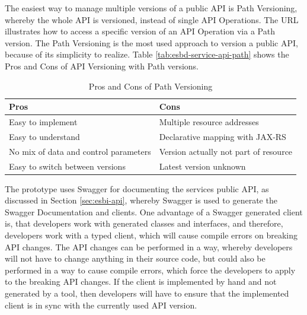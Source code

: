 The easiest way to manage multiple versions of a public API is Path Versioning, whereby the whole API is versioned, instead of single API Operations. The URL  illustrates how to access a specific version of an API Operation via a Path version. The Path Versioning is the most used approach to version a public API, because of its simplicity to realize.  Table \vref{tab:esbd-service-api-path} shows the Pros and Cons of API Versioning with Path versions.

{\renewcommand{\arraystretch}{1.2}%
	\begin{table}[h]
		\begin{tabularx}{\textwidth}{ X|X }	
			\textbf{Pros}                         & \textbf{Cons}                         \\ \hline
			Easy to implement                     & Multiple resource addresses           \\ \hline
			Easy to understand                    & Declarative mapping with JAX-RS       \\ \hline
			No mix of data and control parameters & Version actually not part of resource \\ \hline
			Easy to switch between versions       & Latest version unknown                \\ \hline
		\end{tabularx}
		\caption{Pros and Cons of Path Versioning}
		\label{tab:esbd-service-api-path}
\end{table}}

The prototype uses Swagger for documenting the services public API, as discussed in Section \vref{sec:esbi-api}, whereby Swagger is used to generate the Swagger Documentation and clients. One advantage of a Swagger generated client is, that developers work with generated classes and interfaces, and therefore, developers work with a typed client, which will cause compile errors on breaking API changes. The API changes can be performed in a way, whereby developers will not have to change anything in their source code, but could also be performed in a way to cause compile errors, which force the developers to apply to the breaking API changes. If the client is implemented by hand and not generated by a tool, then developers will have to ensure that the implemented client is in sync with the currently used API version.

